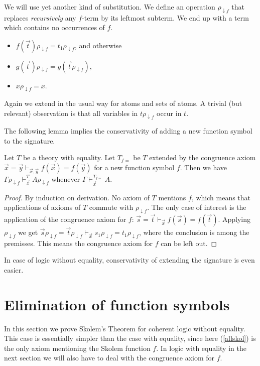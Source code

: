 \documentclass[10pt,a4paper]{article}
\newcommand{\ldf}[1]{#1\rho_{{\downarrow}f}}
\begin{document}
We will use yet another kind of substitution. We define an operation
$\ldf{}$ that replaces \emph{recursively} any $f$-term by its leftmost subterm. 
We end up with a term which contains no occurrences of $f$.
\begin{itemize}
\item $\ldf{f(\vec{t})} = \ldf{t_1}$, and otherwise
\item $\ldf{g(\vec{t})} = g(\ldf{\vec{t}})$,
\item $\ldf{x} = x$.
\end{itemize}
Again we extend in the usual way for atoms and sets of atoms.
A trivial (but relevant) observation is that all variables in $\ldf{t}$ occur in $t$.

The following lemma implies the conservativity of adding a new
function symbol to the signature.

\begin{lemma}\label{subst3}
Let $T$ be a theory with equality.
Let $T_{f{=}}$ be $T$ extended by the congruence axiom 
$\vec{x}=\vec{y} \vdash_{\vec{x},\vec{y}} f(\vec{x}) = f(\vec{y})$
for a new function symbol $f$. 
Then we have $\ldf{\Gamma}\vdash_{\vec{x}}^T \ldf{A}$
whenever $\Gamma\vdash_{\vec{x}}^{T_{f{=}}} A$.
\end{lemma}

\begin{proof}
By induction on derivation. No axiom of $T$ mentions $f$, which means
that applications of axioms of $T$ commute with $\ldf{}$. The only case of
interest is the application of the  congruence axiom for $f$:
$\vec{s}=\vec{t} \vdash_{\vec{x}} f(\vec{s}) = f(\vec{t})$. Applying $\ldf{}$ we get 
$\vec{s}\ldf{}=\vec{t}\ldf{} \vdash_{\vec{x}} s_1\ldf{} = t_1\ldf{}$,
where the conclusion is among the premisses. This means the congruence
axiom for $f$ can be left out.
\end{proof}
In case of logic without equality, conservativity of extending the signature
is even easier.


\section{Elimination of function symbols}\label{sec:skolemfunction}

In this section we prove Skolem's Theorem for coherent logic without equality.
This case is essentially simpler than the case with equality, 
since here (\ref{allskol}) is the only axiom
mentioning the Skolem function $f$. In logic with equality in the next section
we will also have to deal with the congruence axiom for $f$.
\end{document}
